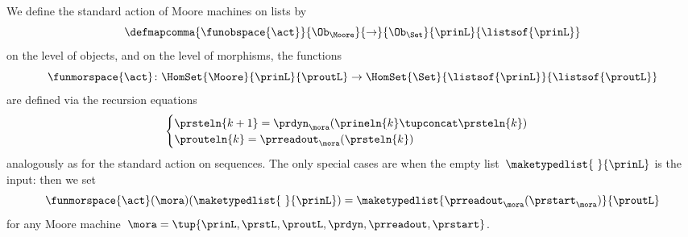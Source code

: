 \begin{definition}
    \label{def:moore-standard-action-on-lists}
    We define the standard action of Moore machines on lists by
    \begin{equation*}
        \defmapcomma{\funobspace{\act}}
        {\Ob_{\Moore}}
        {\to}
        {\Ob_{\Set}}
        {\prinL}
        {\listsof{\prinL}}
    \end{equation*}
    on the level of objects, and on the level of morphisms, the functions
    \begin{equation*}
        \funmorspace{\act} \colon  \HomSet{\Moore}{\prinL}{\proutL} \to \HomSet{\Set}{ \listsof{\prinL}}{\listsof{\proutL}}
    \end{equation*}
    are defined via the recursion equations
    \begin{equation}
        \begin{cases}
            \prsteln{k+1} = \prdyn_\mora(\prineln{k} \tupconcat \prsteln{k}) \\
            \prouteln{k}   = \prreadout_\mora(\prsteln{k})
        \end{cases}
    \end{equation}
    analogously as for the standard action on sequences.
    The only special cases are when the empty list~$\maketypedlist{\ }{\prinL}$ is the input: then we set
    \begin{equation*}
        \funmorspace{\act}(\mora)(\maketypedlist{\ }{\prinL}) = \maketypedlist{ \prreadout_\mora(\prstart_\mora) }{\proutL}
    \end{equation*}
    for any Moore machine~$\mora = \tup{\prinL,\prstL,\proutL,\prdyn,\prreadout,\prstart}$.
\end{definition}

